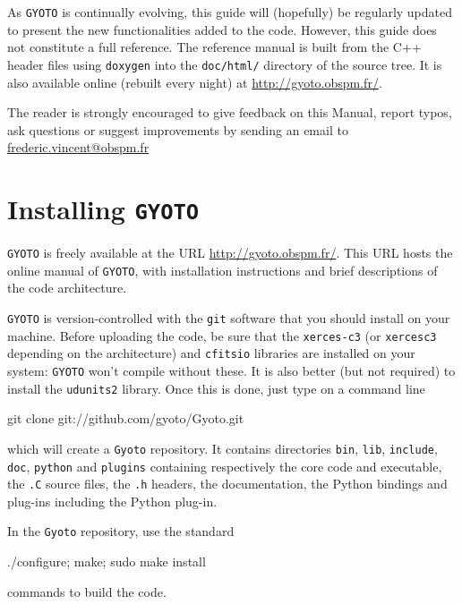 \documentclass[a4paper,12pt]{article}
\begin{document}
As \texttt{GYOTO} is continually evolving, this guide will (hopefully) be regularly updated to present the new functionalities added to the code. However, this guide does not constitute a full reference. The reference manual is built from the C++ header files using \texttt{doxygen} into the \texttt{doc/html/} directory of the source tree. It is also available online (rebuilt every night) at \url{http://gyoto.obspm.fr/}.

The reader is strongly encouraged to give feedback on this Manual, report typos, ask questions or suggest improvements by sending an email to \url{frederic.vincent@obspm.fr}

\tableofcontents



\newpage

\section{Installing \texttt{GYOTO}}
\label{install}

\texttt{GYOTO} is freely available at the URL \url{http://gyoto.obspm.fr/}. This URL hosts the online manual of \texttt{GYOTO}, with installation instructions and brief descriptions of the code architecture.

\texttt{GYOTO} is version-controlled with the \texttt{git} software that you should install on your machine.
Before uploading the code, be sure that the \texttt{xerces-c3} (or \texttt{xercesc3} depending on the
architecture) and \texttt{cfitsio} libraries are installed on your system: \texttt{GYOTO} won't compile without these.
It is also better (but not required) to install the \texttt{udunits2} library. Once this is done, just type on a command line
\begin{code}
git clone git://github.com/gyoto/Gyoto.git
\end{code}  
which will create a \texttt{Gyoto} repository. It contains directories \texttt{bin}, \texttt{lib}, \texttt{include}, \texttt{doc}, \texttt{python} and \texttt{plugins} containing respectively the core code and executable, the \texttt{.C} source files, the \texttt{.h} headers, the documentation, the Python bindings and plug-ins including the Python plug-in.

In the \texttt{Gyoto} repository, use the standard 
\begin{code}
./configure; make; sudo make install 
\end{code}
commands
to build the code.
\end{document}
